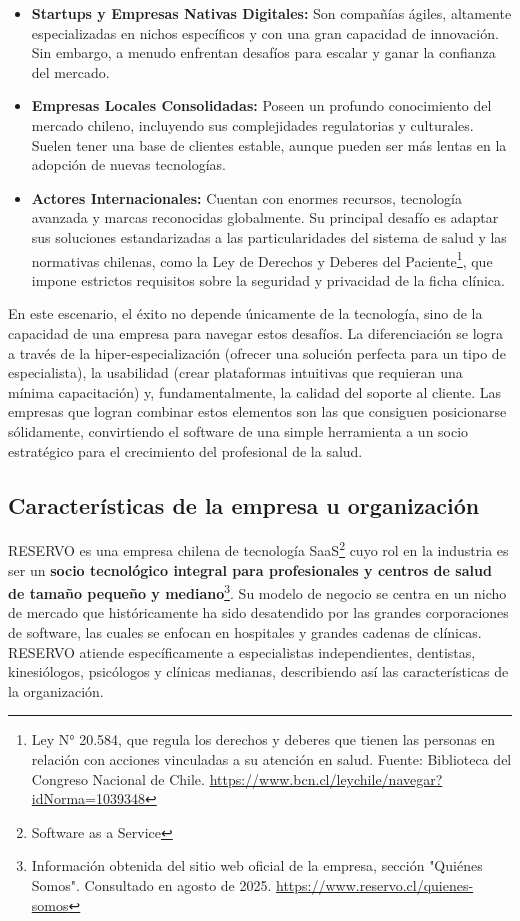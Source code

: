 \begin{itemize}
    \item \textbf{Startups y Empresas Nativas Digitales:} Son compañías ágiles, altamente especializadas en nichos específicos y con una gran capacidad de innovación. Sin embargo, a menudo enfrentan desafíos para escalar y ganar la confianza del mercado.
    
    \item \textbf{Empresas Locales Consolidadas:} Poseen un profundo conocimiento del mercado chileno, incluyendo sus complejidades regulatorias y culturales. Suelen tener una base de clientes estable, aunque pueden ser más lentas en la adopción de nuevas tecnologías.
    
    \item \textbf{Actores Internacionales:} Cuentan con enormes recursos, tecnología avanzada y marcas reconocidas globalmente. Su principal desafío es adaptar sus soluciones estandarizadas a las particularidades del sistema de salud y las normativas chilenas, como la Ley de Derechos y Deberes del Paciente\footnote{Ley N° 20.584, que regula los derechos y deberes que tienen las personas en relación con acciones vinculadas a su atención en salud. Fuente: Biblioteca del Congreso Nacional de Chile. \url{https://www.bcn.cl/leychile/navegar?idNorma=1039348}}, que impone estrictos requisitos sobre la seguridad y privacidad de la ficha clínica.
\end{itemize}

En este escenario, el éxito no depende únicamente de la tecnología, sino de la capacidad de una empresa para navegar estos desafíos. La diferenciación se logra a través de la hiper-especialización (ofrecer una solución perfecta para un tipo de especialista), la usabilidad (crear plataformas intuitivas que requieran una mínima capacitación) y, fundamentalmente, la calidad del soporte al cliente. Las empresas que logran combinar estos elementos son las que consiguen posicionarse sólidamente, convirtiendo el software de una simple herramienta a un socio estratégico para el crecimiento del profesional de la salud.

\subsection{Características de la empresa u organización}

RESERVO es una empresa chilena de tecnología SaaS\footnote{Software as a Service} cuyo rol en la industria es ser un \textbf{socio tecnológico integral para profesionales y centros de salud de tamaño pequeño y mediano}\footnote{Información obtenida del sitio web oficial de la empresa, sección "Quiénes Somos". Consultado en agosto de 2025. \url{https://www.reservo.cl/quienes-somos}}. Su modelo de negocio se centra en un nicho de mercado que históricamente ha sido desatendido por las grandes corporaciones de software, las cuales se enfocan en hospitales y grandes cadenas de clínicas. RESERVO atiende específicamente a especialistas independientes, dentistas, kinesiólogos, psicólogos y clínicas medianas, describiendo así las características de la organización.


